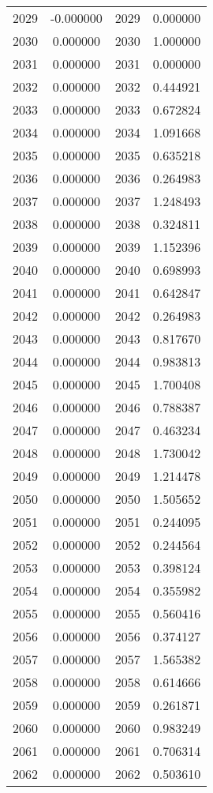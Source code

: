 \documentclass[12pt]{article}
\begin{document}
\begin{longtable}{@{}cccc@{}}
2029 & -0.000000 & 2029 & 0.000000 \\
2030 & 0.000000 & 2030 & 1.000000 \\
2031 & 0.000000 & 2031 & 0.000000 \\
2032 & 0.000000 & 2032 & 0.444921 \\
2033 & 0.000000 & 2033 & 0.672824 \\
2034 & 0.000000 & 2034 & 1.091668 \\
2035 & 0.000000 & 2035 & 0.635218 \\
2036 & 0.000000 & 2036 & 0.264983 \\
2037 & 0.000000 & 2037 & 1.248493 \\
2038 & 0.000000 & 2038 & 0.324811 \\
2039 & 0.000000 & 2039 & 1.152396 \\
2040 & 0.000000 & 2040 & 0.698993 \\
2041 & 0.000000 & 2041 & 0.642847 \\
2042 & 0.000000 & 2042 & 0.264983 \\
2043 & 0.000000 & 2043 & 0.817670 \\
2044 & 0.000000 & 2044 & 0.983813 \\
2045 & 0.000000 & 2045 & 1.700408 \\
2046 & 0.000000 & 2046 & 0.788387 \\
2047 & 0.000000 & 2047 & 0.463234 \\
2048 & 0.000000 & 2048 & 1.730042 \\
2049 & 0.000000 & 2049 & 1.214478 \\
2050 & 0.000000 & 2050 & 1.505652 \\
2051 & 0.000000 & 2051 & 0.244095 \\
2052 & 0.000000 & 2052 & 0.244564 \\
2053 & 0.000000 & 2053 & 0.398124 \\
2054 & 0.000000 & 2054 & 0.355982 \\
2055 & 0.000000 & 2055 & 0.560416 \\
2056 & 0.000000 & 2056 & 0.374127 \\
2057 & 0.000000 & 2057 & 1.565382 \\
2058 & 0.000000 & 2058 & 0.614666 \\
2059 & 0.000000 & 2059 & 0.261871 \\
2060 & 0.000000 & 2060 & 0.983249 \\
2061 & 0.000000 & 2061 & 0.706314 \\
2062 & 0.000000 & 2062 & 0.503610 \\

\end{longtable}
\end{document}
